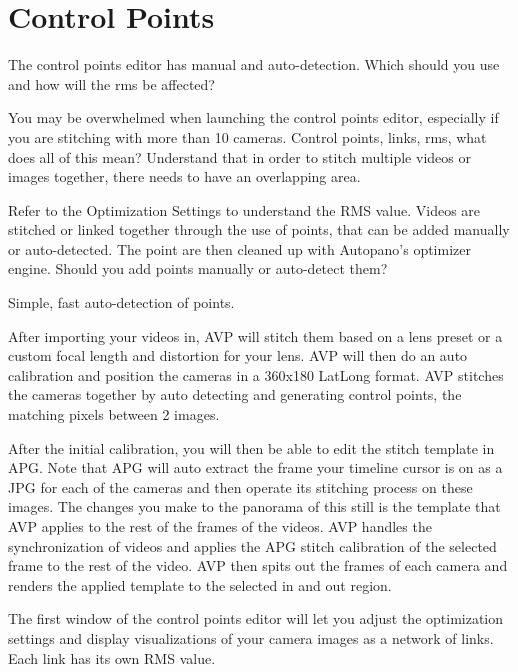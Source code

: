 \chapter{Control Points}
\pagecolor{white}
\label{chap:36}
\begin{fullwidth}


\problem

{\large The control points editor has manual and auto-detection. Which should you use and how will the rms be affected? \par}

You may be overwhelmed when launching the control points editor, especially if you are stitching with more than 10 cameras. Control points, links, rms, what does all of this mean? Understand that in order to stitch multiple videos or images together, there needs to have an overlapping area. 

Refer to the Optimization Settings to understand the RMS value. Videos are stitched or linked together through the use of points, that can be added manually or auto-detected. The point are then cleaned up with Autopano’s optimizer engine. Should you add points manually or auto-detect them?

\solutions

{\large Simple, fast auto-detection of points. \par}

After importing your videos in, AVP will stitch them based on a lens preset or a custom focal length and distortion for your lens. AVP will then do an auto calibration and position the cameras in a 360x180 LatLong format. AVP stitches the cameras together by auto detecting and generating control points, the matching pixels between 2 images.

After the initial calibration, you will then be able to edit the stitch template in APG. Note that APG will auto extract the frame your timeline cursor is on as a JPG for each of the cameras and then operate its stitching process on these images. The changes you make to the panorama of this still is the template that AVP applies to the rest of the frames of the videos. AVP handles the synchronization of videos and applies the APG stitch calibration of the selected frame to the rest of the video. AVP then spits out the frames of each camera and renders the applied template to the selected in and out region. 

The first window of the control points editor will let you adjust the optimization settings and display visualizations of your camera images as a network of links. Each link has its own RMS value.


\end{fullwidth}
